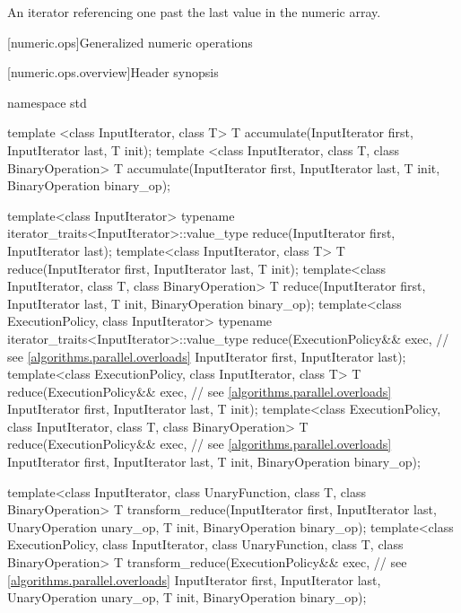\begin{itemdescr}
\pnum
\returns An iterator referencing one past the last value in the numeric array.
\end{itemdescr}


[numeric.ops]{Generalized numeric operations}

[numeric.ops.overview]{Header  synopsis}

%
\begin{codeblock}
namespace std {
  template <class InputIterator, class T>
    T accumulate(InputIterator first, InputIterator last, T init);
  template <class InputIterator, class T, class BinaryOperation>
    T accumulate(InputIterator first, InputIterator last, T init,
                 BinaryOperation binary_op);

  template<class InputIterator>
    typename iterator_traits<InputIterator>::value_type
      reduce(InputIterator first, InputIterator last);
  template<class InputIterator, class T>
    T reduce(InputIterator first, InputIterator last, T init);
  template<class InputIterator, class T, class BinaryOperation>
    T reduce(InputIterator first, InputIterator last, T init,
             BinaryOperation binary_op);
  template<class ExecutionPolicy, class InputIterator>
    typename iterator_traits<InputIterator>::value_type
      reduce(ExecutionPolicy&& exec, // see \ref{algorithms.parallel.overloads}
             InputIterator first, InputIterator last);
  template<class ExecutionPolicy, class InputIterator, class T>
    T reduce(ExecutionPolicy&& exec, // see \ref{algorithms.parallel.overloads}
             InputIterator first, InputIterator last, T init);
  template<class ExecutionPolicy, class InputIterator, class T, class BinaryOperation>
    T reduce(ExecutionPolicy&& exec, // see \ref{algorithms.parallel.overloads}
             InputIterator first, InputIterator last, T init,
             BinaryOperation binary_op);

  template<class InputIterator, class UnaryFunction, class T, class BinaryOperation>
    T transform_reduce(InputIterator first, InputIterator last,
                       UnaryOperation unary_op, T init, BinaryOperation binary_op);
  template<class ExecutionPolicy, class InputIterator,
           class UnaryFunction, class T, class BinaryOperation>
    T transform_reduce(ExecutionPolicy&& exec, // see \ref{algorithms.parallel.overloads}
                       InputIterator first, InputIterator last,
                       UnaryOperation unary_op, T init, BinaryOperation binary_op);

}
\end{codeblock}
